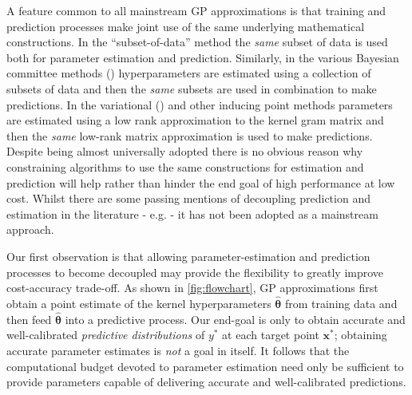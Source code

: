A feature common to all mainstream GP approximations is that training and prediction processes make joint use of the same underlying mathematical constructions. In the ``subset-of-data'' method the {\it same} subset of data is used both for parameter estimation and prediction. Similarly, in the various Bayesian committee methods (\cite{amalg_SOD}) hyperparameters are estimated using a collection of subsets of data and then the {\it same} subsets are used in combination to make predictions. In the variational (\cite{Hensman,Titsias}) and other inducing point methods parameters are estimated using a low rank approximation to the kernel gram matrix and then the {\it same} low-rank matrix approximation is used to make predictions. Despite being almost universally adopted there is no obvious reason why constraining algorithms to use the same constructions for estimation and prediction will help rather than hinder the end goal of high performance at low cost. Whilst there are some passing mentions of decoupling prediction and estimation in the literature - e.g. \cite{Stein2004,Bachoc2022,eval_framework} - it has not been adopted as a mainstream approach. 


Our first observation is that allowing parameter-estimation and prediction processes to become decoupled may provide the flexibility to greatly improve cost-accuracy trade-off. As shown in \autoref{fig:flowchart}, GP approximations first obtain a point estimate of the kernel hyperparameters $\hat{\bm{\theta}}$ from training data and then feed $\hat{\bm{\theta}}$ into a predictive process. Our end-goal is only to obtain accurate and well-calibrated {\it predictive distributions} of $y^*$ at each target point $\bm{x}^*$; obtaining accurate parameter estimates is {\it not} a goal in itself. It follows that the computational budget devoted to parameter estimation need only be sufficient to provide parameters capable of delivering accurate and well-calibrated predictions. 



